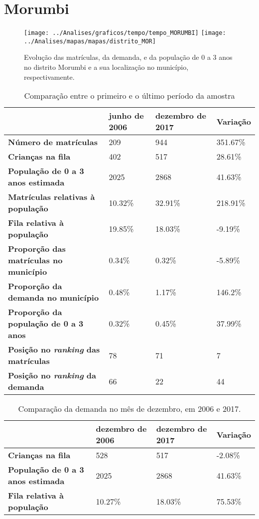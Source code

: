 \section{Morumbi}
\begin{figure}[H]
	\centering
	\texttt{[image: ../Analises/graficos/tempo/tempo\_MORUMBI]}
	\texttt{[image: ../Analises/mapas/mapas/distrito\_MOR]}
	\caption{Evolução das matrículas, da demanda, e da população de 0 a 3 anos no distrito Morumbi e a sua localização no município, respectivamente.}
\end{figure}
\begin{table}[H]
	\begin{tabular}{|l|l|l|l|}
		\hline
		\textbf{}                                      & \textbf{junho de 2006}       & \textbf{dezembro de 2017}    & \textbf{Variação} \\ \hline
		\textbf{Número de matrículas}                  & 209 & 944 & 351.67\% \\ \hline
		\textbf{Crianças na fila}                      & 402 & 517 & 28.61\% \\ \hline
		\textbf{População de 0 a 3 anos estimada}      & 2025 & 2868 & 41.63\% \\ \hline
		\textbf{Matrículas relativas à população}      & 10.32\% & 32.91\% & 218.91\% \\ \hline
		\textbf{Fila relativa à população}             & 19.85\% & 18.03\% & -9.19\% \\ \hline
		\textbf{Proporção das matrículas no município} & 0.34\% & 0.32\% & -5.89\% \\ \hline
		\textbf{Proporção da demanda no município}     & 0.48\% & 1.17\% & 146.2\% \\ \hline
		\textbf{Proporção da população de 0 a 3 anos}  & 0.32\% & 0.45\% & 37.99\% \\ \hline
		\textbf{Posição no \textit{ranking} das matrículas}     & 78 & 71 & 7 \\ \hline
		\textbf{Posição no \textit{ranking} da demanda}         & 66 & 22 & 44 \\ \hline
	\end{tabular}
	\caption{Comparação entre o primeiro e o último período da amostra}
\end{table}
\begin{table}[H]
	\begin{tabular}{|l|l|l|l|}
		\hline
		\textbf{}                                 & \textbf{dezembro de 2006} & \textbf{dezembro de 2017} & \textbf{Variação} \\ \hline
		\textbf{Crianças na fila}                      & 528 & 517 & -2.08\% \\ \hline
		\textbf{População de 0 a 3 anos estimada}      & 2025 & 2868 & 41.63\% \\ \hline
		\textbf{Fila relativa à população}             & 10.27\% & 18.03\% & 75.53\% \\ \hline
	\end{tabular}
	\caption{Comparação da demanda no mês de dezembro, em 2006 e 2017.}
\end{table}
